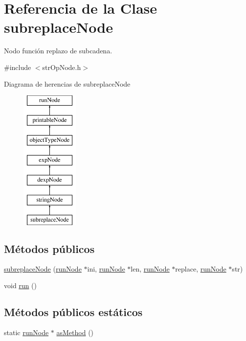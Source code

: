 \hypertarget{classsubreplaceNode}{\section{Referencia de la Clase subreplace\-Node}
\label{classsubreplaceNode}
}


Nodo función replazo de subcadena.  




{\ttfamily \#include $<$str\-Op\-Node.\-h$>$}

Diagrama de herencias de subreplace\-Node\begin{figure}[H]
\begin{center}
\leavevmode
\includegraphics[height=7.000000cm]{classsubreplaceNode}
\end{center}
\end{figure}
\subsection*{Métodos públicos}
\begin{DoxyCompactItemize}
\item 
\hyperlink{classsubreplaceNode_a9398100d18db77e5fc85f3d6d134aaa5}{subreplace\-Node} (\hyperlink{classrunNode}{run\-Node} $\ast$ini, \hyperlink{classrunNode}{run\-Node} $\ast$len, \hyperlink{classrunNode}{run\-Node} $\ast$replace, \hyperlink{classrunNode}{run\-Node} $\ast$str)
\item 
void \hyperlink{classsubreplaceNode_a145d05be6f2fec48b084dabd35599e20}{run} ()
\end{DoxyCompactItemize}
\subsection*{Métodos públicos estáticos}
\begin{DoxyCompactItemize}
\item 
static \hyperlink{classrunNode}{run\-Node} $\ast$ \hyperlink{classsubreplaceNode_a1f8f3f3176aaeb58f5d633a00db7fdf0}{as\-Method} ()
\end{DoxyCompactItemize}

